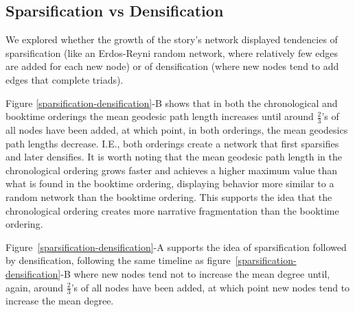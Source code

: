 \subsection{Sparsification vs Densification}

We explored whether the growth of the story's network displayed tendencies of sparsification (like an Erdos-Reyni random network, where relatively few edges are added for each new node) or of densification (where new nodes tend to add edges that complete triads).

Figure \ref{sparsification-densification}-B shows that in both the chronological and booktime orderings the mean geodesic path length increases until around $\frac{2}{3}$'s of all nodes have been added, at which point, in both orderings, the mean geodesics path lengths decrease. I.E., both orderings create a network that first sparsifies and later densifies. It is worth noting that the mean geodesic path length in the chronological ordering grows faster and achieves a higher maximum value than what is found in the booktime ordering, displaying behavior more similar to a random network than the booktime ordering. This supports the idea that the chronological ordering creates more narrative fragmentation than the booktime ordering.

Figure~\ref{sparsification-densification}-A supports the idea of sparsification followed by densification, following the same timeline as figure~\ref{sparsification-densification}-B where new nodes tend not to increase the mean degree until, again, around $\frac{2}{3}$'s of all nodes have been added, at which point new nodes tend to increase the mean degree.

